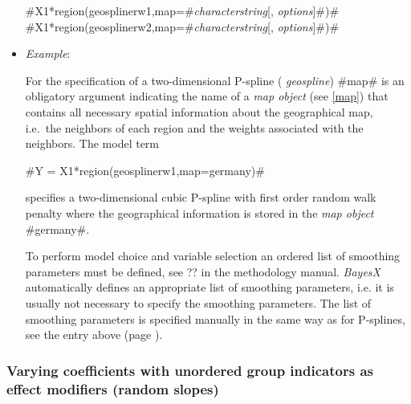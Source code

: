 \begin{itemize}
#X1*region(geosplinerw1,map=#{\em characterstring}[, {\em options}]#)# \\
#X1*region(geosplinerw2,map=#{\em characterstring}[, {\em options}]#)#
\item[] {\em Example}:

For the specification of a two-dimensional P-spline ({\em
geospline}) #map# is an obligatory argument indicating the name of
a {\em map object} (see \autoref{map}) that contains all necessary
spatial information about the geographical map, i.e.~the neighbors
of each region and the weights associated with the neighbors. The
model term

#Y = X1*region(geosplinerw1,map=germany)#

specifies a two-dimensional cubic P-spline with first order random
walk penalty where the geographical information is stored in the
{\em map object} #germany#.

To perform model choice and variable selection an ordered list of smoothing parameters must be defined, see ??
in the methodology manual. {\em BayesX} automatically defines an appropriate list of smoothing parameters, i.e. it
is usually not necessary to  specify the smoothing parameters.
The list of smoothing parameters is specified manually in the same way as for P-splines,
see the entry above (page \pageref{psplines_stepwise}).
\end{itemize}



\subsubsection*{Varying coefficients with unordered group indicators
as effect modifiers (random slopes)}

